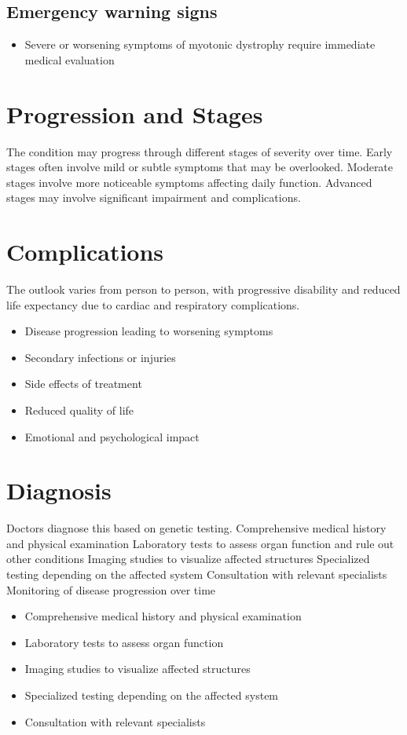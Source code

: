\subsection{Emergency warning signs}
\begin{itemize}[noitemsep]
  \item Severe or worsening symptoms of myotonic dystrophy require immediate medical evaluation
\end{itemize}
\section{Progression and Stages}
The condition may progress through different stages of severity over time. Early stages often involve mild or subtle symptoms that may be overlooked. Moderate stages involve more noticeable symptoms affecting daily function. Advanced stages may involve significant impairment and complications.
\section{Complications}
The outlook varies from person to person, with progressive disability and reduced life expectancy due to cardiac and respiratory complications.

\begin{itemize}[noitemsep]
  \item Disease progression leading to worsening symptoms
  \item Secondary infections or injuries
  \item Side effects of treatment
  \item Reduced quality of life
  \item Emotional and psychological impact
\end{itemize}
\section{Diagnosis}
Doctors diagnose this based on genetic testing. Comprehensive medical history and physical examination Laboratory tests to assess organ function and rule out other conditions Imaging studies to visualize affected structures Specialized testing depending on the affected system Consultation with relevant specialists Monitoring of disease progression over time

\begin{itemize}[noitemsep]
  \item Comprehensive medical history and physical examination
  \item Laboratory tests to assess organ function
  \item Imaging studies to visualize affected structures
  \item Specialized testing depending on the affected system
  \item Consultation with relevant specialists
\end{itemize}
